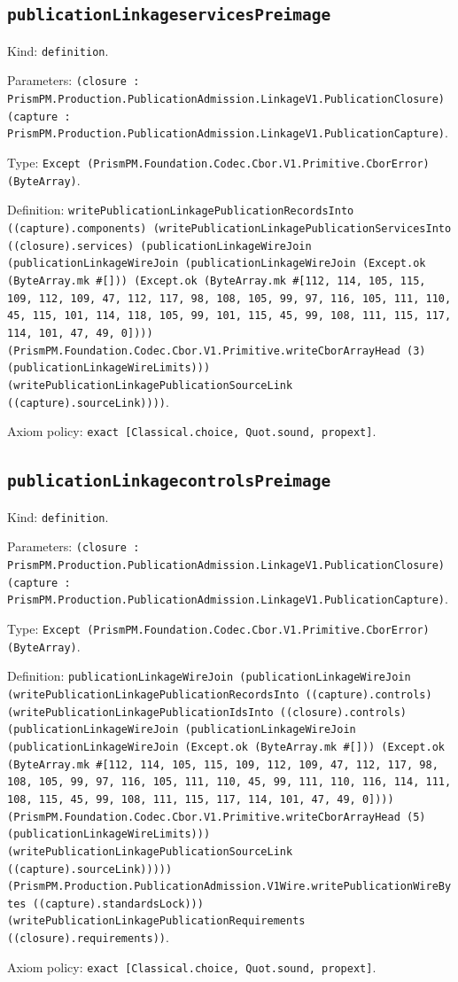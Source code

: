 \documentclass[11pt]{article}
\begin{document}
\subsection*{\texttt{publicationLinkageservicesPreimage}}
\noindent Kind: \texttt{definition}.\par
\noindent Parameters: \texttt{(closure : PrismPM.Production.PublicationAdmission.LinkageV1.PublicationClosure) (capture : PrismPM.Production.PublicationAdmission.LinkageV1.PublicationCapture)}.\par
\noindent Type: \texttt{Except (PrismPM.Foundation.Codec.Cbor.V1.Primitive.CborError) (ByteArray)}.\par
\noindent Definition: \texttt{writePublicationLinkagePublicationRecordsInto ((capture).components) (writePublicationLinkagePublicationServicesInto ((closure).services) (publicationLinkageWireJoin (publicationLinkageWireJoin (publicationLinkageWireJoin (Except.ok (ByteArray.mk \#[])) (Except.ok (ByteArray.mk \#[112, 114, 105, 115, 109, 112, 109, 47, 112, 117, 98, 108, 105, 99, 97, 116, 105, 111, 110, 45, 115, 101, 114, 118, 105, 99, 101, 115, 45, 99, 108, 111, 115, 117, 114, 101, 47, 49, 0]))) (PrismPM.Foundation.Codec.Cbor.V1.Primitive.writeCborArrayHead (3) (publicationLinkageWireLimits))) (writePublicationLinkagePublicationSourceLink ((capture).sourceLink))))}.\par
\noindent Axiom policy: \texttt{exact [Classical.choice, Quot.sound, propext]}.\par
\subsection*{\texttt{publicationLinkagecontrolsPreimage}}
\noindent Kind: \texttt{definition}.\par
\noindent Parameters: \texttt{(closure : PrismPM.Production.PublicationAdmission.LinkageV1.PublicationClosure) (capture : PrismPM.Production.PublicationAdmission.LinkageV1.PublicationCapture)}.\par
\noindent Type: \texttt{Except (PrismPM.Foundation.Codec.Cbor.V1.Primitive.CborError) (ByteArray)}.\par
\noindent Definition: \texttt{publicationLinkageWireJoin (publicationLinkageWireJoin (writePublicationLinkagePublicationRecordsInto ((capture).controls) (writePublicationLinkagePublicationIdsInto ((closure).controls) (publicationLinkageWireJoin (publicationLinkageWireJoin (publicationLinkageWireJoin (Except.ok (ByteArray.mk \#[])) (Except.ok (ByteArray.mk \#[112, 114, 105, 115, 109, 112, 109, 47, 112, 117, 98, 108, 105, 99, 97, 116, 105, 111, 110, 45, 99, 111, 110, 116, 114, 111, 108, 115, 45, 99, 108, 111, 115, 117, 114, 101, 47, 49, 0]))) (PrismPM.Foundation.Codec.Cbor.V1.Primitive.writeCborArrayHead (5) (publicationLinkageWireLimits))) (writePublicationLinkagePublicationSourceLink ((capture).sourceLink))))) (PrismPM.Production.PublicationAdmission.V1Wire.writePublicationWireBytes ((capture).standardsLock))) (writePublicationLinkagePublicationRequirements ((closure).requirements))}.\par
\noindent Axiom policy: \texttt{exact [Classical.choice, Quot.sound, propext]}.\par
\end{document}
